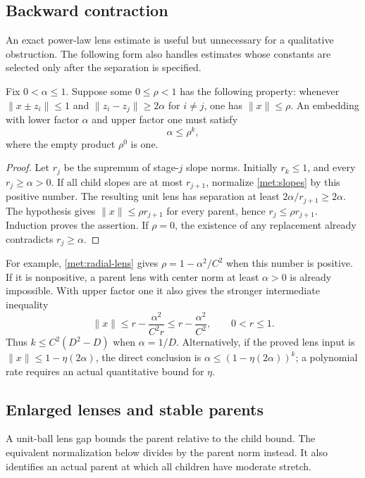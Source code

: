 \subsection{Backward contraction}\label{met:backward-section}
An exact power-law lens estimate is useful but unnecessary for a
qualitative obstruction. The following form also handles estimates whose
constants are selected only after the separation is specified.

\begin{proposition}\label{met:backward}
Fix $0<\alpha\le1$. Suppose some $0\le\rho<1$ has the following
property: whenever $\|x\pm z_i\|\le1$ and
$\|z_i-z_j\|\ge2\alpha$ for $i\ne j$, one has $\|x\|\le\rho$.
An embedding with lower factor $\alpha$ and upper factor one must satisfy
\begin{equation}\label{met:backward-bound}
 \alpha\le\rho^k,
\end{equation}
where the empty product $\rho^0$ is one.
\end{proposition}
\begin{proof}
Let $r_j$ be the supremum of stage-$j$ slope norms. Initially $r_k\le1$,
and every $r_j\ge\alpha>0$. If all child slopes are at most $r_{j+1}$,
normalize \eqref{met:slopes} by this positive number. The resulting
unit lens has separation at least $2\alpha/r_{j+1}\ge2\alpha$.
The hypothesis gives $\|x\|\le\rho r_{j+1}$ for every parent, hence
$r_j\le\rho r_{j+1}$. Induction proves the assertion. If $\rho=0$,
the existence of any replacement already contradicts $r_j\ge\alpha$.
\end{proof}

For example, \eqref{met:radial-lens} gives
$\rho=1-\alpha^2/C^2$ when this number is positive. If it is
nonpositive, a parent lens with center norm at least $\alpha>0$
is already impossible. With upper factor one it also gives the stronger
intermediate inequality
\[
 \|x\|\le r-\frac{\alpha^2}{C^2r}
 \le r-\frac{\alpha^2}{C^2},\qquad 0<r\le1.
\]
Thus $k\le C^2(D^2-D)$ when $\alpha=1/D$. Alternatively, if the proved
lens input is $\|x\|\le1-\eta(2\alpha)$, the direct conclusion is
$\alpha\le(1-\eta(2\alpha))^k$; a polynomial rate requires an actual
quantitative bound for $\eta$.

\subsection{Enlarged lenses and stable parents}\label{met:selection-section}
\label{met:bridge:enlarged-section}
A unit-ball lens gap bounds the parent relative to the child bound.
The equivalent normalization below divides by the parent norm instead.
It also identifies an actual parent at which all children have moderate
stretch.

